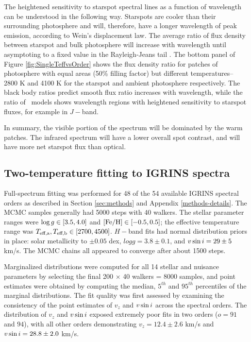 \documentclass[twocolumn]{emulateapj}%
\begin{document}
The heightened sensitivity to starspot spectral lines as a function of wavelength can be understood in the following way.  Starspots are cooler than their surrounding photosphere and will, therefore, have a longer wavelength of peak emission, according to Wein's displacement law.  The average ratio of flux density between starspot and bulk photosphere will increase with wavelength until asymptoting to a fixed value in the Rayleigh-Jeans tail \citep{wolk96}.  The bottom panel of Figure \ref{fig:SingleTeffvsOrder} shows the flux density ratio for patches of photosphere with equal areas (50\% filling factor) but different temperatures-- 2800 K and 4100 K for the starspot and ambient photosphere respectively.  The black body ratios predict smooth flux ratio increases with wavelength, while the ratio of \PHOENIX\ models shows wavelength regions with heightened sensitivity to starspot fluxes, for example in $J-$band.

In summary, the visible portion of the spectrum will be dominated by the warm patches.  The infrared spectrum will have a lower overall spot contrast, and will have more net starspot flux than optical.


\subsection{Two-temperature fitting to IGRINS spectra}\label{sec:two_tempIGRINS}

Full-spectrum fitting was performed for 48 of the 54 available IGRINS spectral orders as described in Section \ref{sec:methods} and Appendix \ref{methods-details}.  The MCMC samples generally had 5000 steps with 40 walkers.  The stellar parameter ranges were $\log g \in [3.5, 4.0]$ and $[{\rm Fe}/{\rm H}] \in [-0.5, 0.5]$; the effective temperature range was $T_\textrm{eff,a}, T_\textrm{eff,b} \in [2700, 4500]$.  $H-$band fits had normal distribution priors in place: solar metallicity to $\pm0.05$ dex, $logg=3.8\pm0.1$, and $v \sin i=29\pm5$ km/s.  The MCMC chains all appeared to converge after about 1500 steps.

Marginalized distributions were computed for all 14 stellar and nuisance parameters by selecting the final 200 $\times$ 40 walkers = 8000 samples, and point estimates were obtained by computing the median, $5^{th}$ and $95^{th}$ percentiles of the marginal distributions.  The fit quality was first assessed by examining the consistency of the point estimates of $v_z$ and $v \sin i$ across the spectral orders.  The distribution of $v_z$ and $v \sin i$ exposed extremely poor fits in two orders ($o=91$ and $94$), with all other orders demonstrating $v_z = 12.4 \pm 2.6$ km/s and $v \sin i = 28.8 \pm 2.0$ km/s.  
\end{document}
